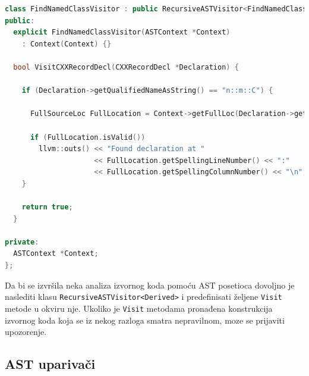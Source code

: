 \documentclass[12pt,oneside]{memoir}
\begin{document}
\begin{lstlisting}[caption={Primer posetioaca koji pose\'{c}uje sve strukture, unije i klase i ispisuje lokaciju onih koji se zovu n::m::C \cite{ASTToolTutorial}},label=lst:label6,language=C++, captionpos=b]
class FindNamedClassVisitor : public RecursiveASTVisitor<FindNamedClassVisitor> {
public:
  explicit FindNamedClassVisitor(ASTContext *Context)
    : Context(Context) {}

  bool VisitCXXRecordDecl(CXXRecordDecl *Declaration) {

    if (Declaration->getQualifiedNameAsString() == "n::m::C") {

      FullSourceLoc FullLocation = Context->getFullLoc(Declaration->getBeginLoc());

      if (FullLocation.isValid())
        llvm::outs() << "Found declaration at "
                     << FullLocation.getSpellingLineNumber() << ":"
                     << FullLocation.getSpellingColumnNumber() << "\n";
    }

    return true;
  }

private:
  ASTContext *Context;
};
\end{lstlisting}

\par
Da bi se izvršila neka analiza izvornog koda pomoću AST posetioca dovoljno je naslediti klasu 
 \lstinline{RecursiveASTVisitor<Derived>} i predefinisati željene \lstinline{Visit} metode u okviru nje. Ukoliko je \lstinline{Visit} metodama pronađena konstrukcija izvornog koda koja se iz nekog razloga smatra nepravilnom, moze se prijaviti upozorenje.

\subsection{AST upariva\v{c}i}
\end{document}
